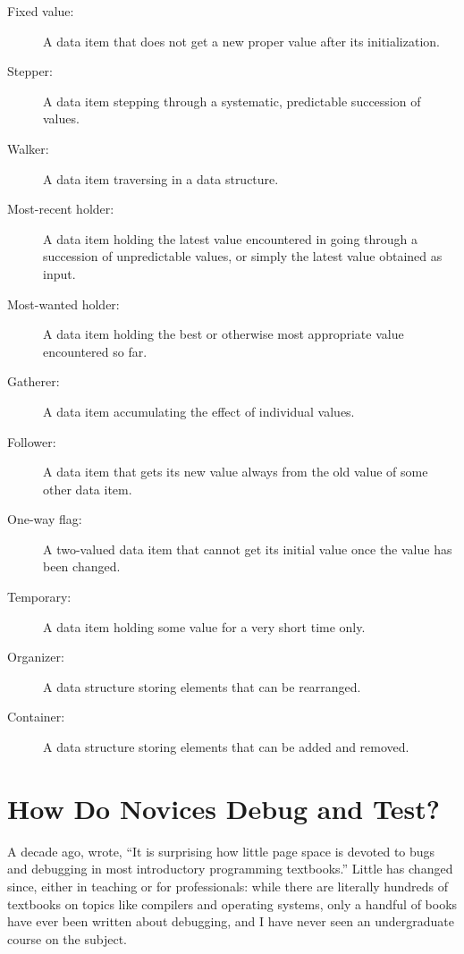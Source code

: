 \begin{description}

\item[Fixed value:] A data item that does not get a new proper value
  after its initialization.

\item[Stepper:] A data item stepping through a systematic, predictable
  succession of values.

\item[Walker:] A data item traversing in a data structure.

\item[Most-recent holder:] A data item holding the latest value
  encountered in going through a succession of unpredictable values,
  or simply the latest value obtained as input.

\item[Most-wanted holder:] A data item holding the best or otherwise
  most appropriate value encountered so far.

\item[Gatherer:] A data item accumulating the effect of individual
  values.

\item[Follower:] A data item that gets its new value always from the
  old value of some other data item.

\item[One-way flag:] A two-valued data item that cannot get its
  initial value once the value has been changed.

\item[Temporary:] A data item holding some value for a very short time
  only.

\item[Organizer:] A data structure storing elements that can be
  rearranged.

\item[Container:] A data structure storing elements that can be added
  and removed.

\end{description}

\section{How Do Novices Debug and Test?}\label{s:pck-debug}

A decade ago, \cite{McCa2008} wrote, ``It is surprising how little
page space is devoted to bugs and debugging in most introductory
programming textbooks.''  Little has changed since, either in teaching
or for professionals: while there are literally hundreds of textbooks
on topics like compilers and operating systems, only a handful of
books have ever been written about debugging, and I have never seen an
undergraduate course on the subject.

